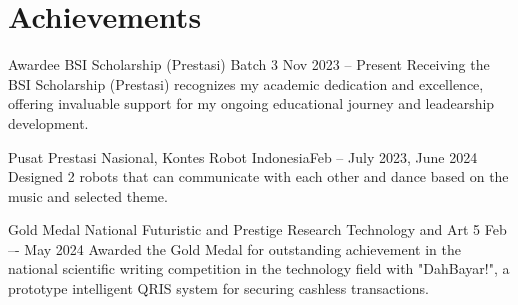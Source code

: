 \section{Achievements}
\resumeSubHeadingListStart
    
    \achiSubheading
    {Awardee BSI Scholarship (Prestasi) Batch 3 }{Nov 2023 -- Present}
    {Receiving the BSI Scholarship (Prestasi) recognizes my academic dedication and excellence, offering invaluable support for my ongoing educational journey and leadearship development.}{}

    \achiSubheading
    {Pusat Prestasi Nasional, Kontes Robot Indonesia}{Feb -- July 2023, June 2024}
    {Designed 2 robots that can communicate with each other and dance based on the music and selected theme.}{}
    \resumeItemListStart
    \resumeItemListEnd

    \achiSubheading
    {Gold Medal National Futuristic and Prestige Research Technology and Art 5 }{Feb –- May 2024}
    {Awarded the Gold Medal for outstanding achievement in the national scientific writing competition in the technology field with "DahBayar!", a prototype intelligent QRIS system for securing cashless transactions.}{}
    


\resumeSubHeadingListEnd